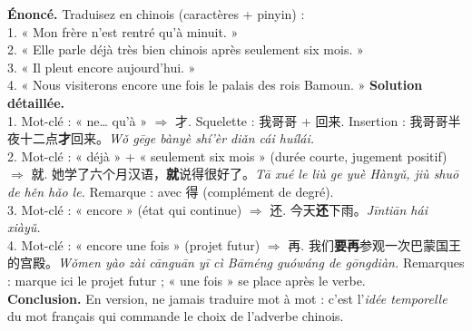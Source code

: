\documentclass[11pt]{article}
\newcommand{\zh}[1]{\ifmmode\text{#1}\else{#1}\fi}
\begin{document}
\begin{exoresolu}
\textbf{Énoncé.} Traduisez en chinois (caractères + pinyin) :\\
1. « Mon frère n'est rentré qu'à minuit. »\\
2. « Elle parle déjà très bien chinois après seulement six mois. »\\
3. « Il pleut encore aujourd'hui. »\\
4. « Nous visiterons encore une fois le palais des rois Bamoun. »
\tcblower
\textbf{Solution détaillée.}\\
1. Mot-clé : « ne… qu'à » $\Rightarrow$ 才. Squelette : 我哥哥 + 回来. Insertion : 我哥哥半夜十二点\textbf{才}回来。\emph{Wǒ gēge bànyè shí'èr diǎn cái huílái.}\\
2. Mot-clé : « déjà » + « seulement six mois » (durée courte, jugement positif) $\Rightarrow$ 就. 她学了六个月汉语，\textbf{就}说得很好了。\emph{Tā xué le liù ge yuè Hànyǔ, jiù shuō de hěn hǎo le.} Remarque : \zh{说得很好} avec 得 (complément de degré).\\
3. Mot-clé : « encore » (état qui continue) $\Rightarrow$ 还. 今天\textbf{还}下雨。\emph{Jīntiān hái xiàyǔ.}\\
4. Mot-clé : « encore une fois » (projet futur) $\Rightarrow$ 再. 我们\textbf{要再}参观一次巴蒙国王的宫殿。\emph{Wǒmen yào zài cānguān yī cì Bāméng guówáng de gōngdiàn.} Remarques : \zh{要} marque ici le projet futur ; \zh{一次} « une fois » se place après le verbe.\\
\textbf{Conclusion.} En version, ne jamais traduire mot à mot : c'est l'\emph{idée temporelle} du mot français qui commande le choix de l'adverbe chinois.
\end{exoresolu}
\end{document}
